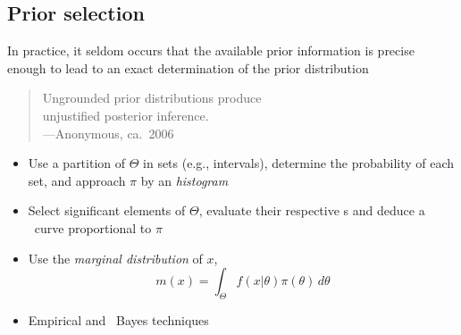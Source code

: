 \subsection{Prior selection}
\begin{slide}

\centerline{}

\medskip
{}

In practice, it seldom occurs that the available prior 
information  is precise enough to lead to an exact 
determination of the prior distribution\\

\medskip\pause
\centerline{}

\end{slide}\begin{slide}

\small\begin{flushleft}
\begin{quote}
Ungrounded prior distributions produce\\
unjustified posterior inference.\\
---Anonymous, ca.~2006
\end{quote}
\end{flushleft}\normalsize

\pause
\begin{itemize}
\item Use a partition of $\Theta$ in sets (e.g., intervals), 
determine the probability of each set, and approach $\pi$
by an {\it histogram\/}
\pause
\item Select significant elements of
$\Theta$, evaluate their respective \like s and deduce a \like\
curve proportional to $\pi$
\pause
\item Use the {\it marginal distribution} of $x$,
$$
  m(x) = \int_\Theta f(x|\theta)\pi(\theta) \,d\theta
$$ 
\pause
\item Empirical and {\it \hier}\ Bayes techniques
\end{itemize}
\end{slide}
